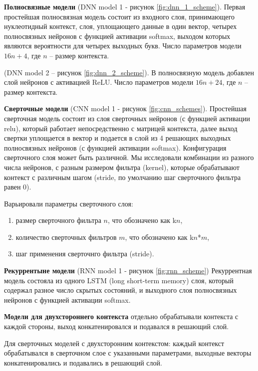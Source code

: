 

{\bfseries Полносвязные модели} (DNN model 1 - рисунок \ref{fig:dnn_1_scheme}). Первая простейшая полносвязная модель состоит из входного слоя, принимающего нуклеотидный контекст, слоя, уплощающего данные в один вектор, четырех полносвязных нейронов с функцией активации softmax, выходом которых являются вероятности для четырех выходных букв. Число параметров модели $16n + 4$, где $n$ -- размер контекста.

(DNN model 2 -- рисунок \ref{fig:dnn_2_scheme}). В полносвязную модель добавлен слой нейронов с активацией ReLU. Число параметров модели $16n + 24$, где $n$ -- размер контекста.


{\bfseries Сверточные модели} (CNN model 1 - рисунок \ref{fig:cnn_schemes}).
Простейшая сверточная модель состоит из слоя сверточных нейронов (с функцией активации relu), который работает непосредственно с матрицей контекста, далее выход свертки уплощается в вектор и подается в слой из 4 решающих выходных полносвязных нейронов (с функцией активации softmax). Конфигурация сверточного слоя может быть различной. Мы исследовали комбинации из разного числа нейронов, с разным размером фильтра (kernel), которые обрабатывают контекст с различным шагом (stride, по умолчанию шаг сверточного фильтра равен 0).

Варьировали параметры сверточного слоя: 
\begin{enumerate}[noitemsep,topsep=0pt]
		\item размер сверточного фильтра $n$, что обозначено как k$n$,
		\item количество сверточных фильтров $m$, что обозначено как k$n$*$m$,
		\item шаг применения сверточнго фильтра (stride). 
			\end{enumerate}
 
 
{\bfseries Рекуррентыне модели } (RNN model 1 - рисунок \ref{fig:rnn_scheme}) Рекуррентная модель состояла из одного LSTM (long short-term memory) слоя, который содержал разное число скрытых состояний, и выходного слоя полносвязных нейронов с функцией активации softmax. 

{\bfseries Модели для двухстороннего контекста} отдельно обрабатывали контекста с каждой стороны, выход конкатенировался и подавался в решающий слой.

Для сверточных моделей с двухсторонним контекстом: каждый контекст обрабатывался в сверточном слое с указанными параметрами, выходные векторы конкатенировались и подавались в решающий слой.


